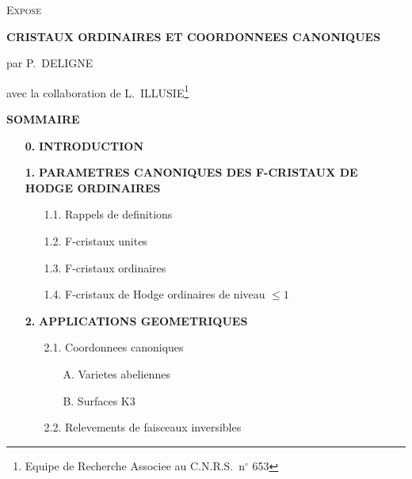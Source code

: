 \documentclass[12pt,a4paper]{article}
\theoremstyle{plain}
\theoremstyle{definition}
\theoremstyle{remark}
\begin{document}
\thispagestyle{empty}

\begin{center}
{\Large\scshape Expose}

\vspace{1cm}

{\LARGE\bfseries CRISTAUX ORDINAIRES ET COORDONNEES CANONIQUES}

\vspace{1cm}

{\large par P.\ DELIGNE}

\vspace{0.5cm}

{avec la collaboration de L.\ ILLUSIE}\footnote{Equipe de Recherche Associee au C.N.R.S.\ n$^\circ$ 653}
\end{center}

\vspace{1cm}

\begin{center}
\textbf{SOMMAIRE}
\end{center}

\begin{itemize}[label={}, leftmargin=*, itemsep=0pt]
\item[\textbf{0.}] \textbf{INTRODUCTION}
\item[\textbf{1.}] \textbf{PARAMETRES CANONIQUES DES F-CRISTAUX DE HODGE ORDINAIRES}
\begin{itemize}[label={}, leftmargin=2em, itemsep=0pt]
\item[1.1.] Rappels de definitions
\item[1.2.] F-cristaux unites
\item[1.3.] F-cristaux ordinaires
\item[1.4.] F-cristaux de Hodge ordinaires de niveau $\leq 1$
\end{itemize}
\item[\textbf{2.}] \textbf{APPLICATIONS GEOMETRIQUES}
\begin{itemize}[label={}, leftmargin=2em, itemsep=0pt]
\item[2.1.] Coordonnees canoniques
\begin{itemize}[label={}, leftmargin=2em, itemsep=0pt]
\item[A.] Varietes abeliennes
\item[B.] Surfaces K3
\end{itemize}
\item[2.2.] Relevements de faisceaux inversibles
\end{itemize}
\end{itemize}
\end{document}
